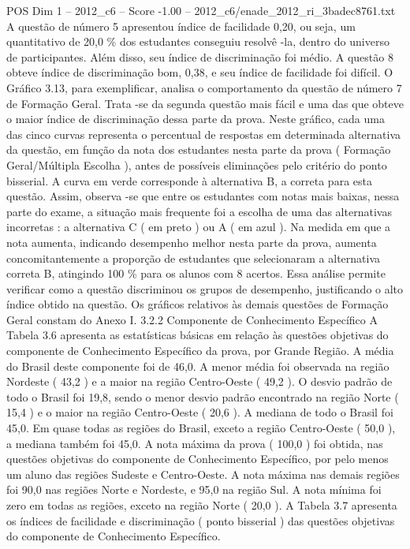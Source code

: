 \begin{textsample}{POS Dim 1 – 2012\_c6 – Score -1.00 – 2012\_c6/enade\_2012\_ri\_3badec8761.txt}
A questão de número 5 apresentou índice de facilidade 0,20, ou seja, um quantitativo de 20,0 \% dos estudantes conseguiu resolvê -la, dentro do universo de participantes.
Além disso, seu índice de discriminação foi médio.
A questão 8 obteve índice de discriminação bom, 0,38, e seu índice de facilidade foi difícil.
O Gráfico 3.13, para exemplificar, analisa o comportamento da questão de número 7 de Formação Geral.
Trata -se da segunda questão mais fácil e uma das que obteve o maior índice de discriminação dessa parte da prova.
Neste gráfico, cada uma das cinco curvas representa o percentual de respostas em determinada alternativa da questão, em função da nota dos estudantes nesta parte da prova ( Formação Geral/Múltipla Escolha ), antes de possíveis eliminações pelo critério do ponto bisserial.
A curva em verde corresponde à alternativa B, a correta para esta questão.
Assim, observa -se que entre os estudantes com notas mais baixas, nessa parte do exame, a situação mais frequente foi a escolha de uma das alternativas incorretas : a alternativa C ( em preto ) ou A ( em azul ).
Na medida em que a nota aumenta, indicando desempenho melhor nesta parte da prova, aumenta concomitantemente a proporção de estudantes que selecionaram a alternativa correta B, atingindo 100 \% para os alunos com 8 acertos.
Essa análise permite verificar como a questão discriminou os grupos de desempenho, justificando o alto índice obtido na questão.
Os gráficos relativos às demais questões de Formação Geral constam do Anexo I. 3.2.2 Componente de Conhecimento Específico A Tabela 3.6 apresenta as estatísticas básicas em relação às questões objetivas do componente de Conhecimento Específico da prova, por Grande Região.
A média do Brasil deste componente foi de 46,0.
A menor média foi observada na região Nordeste ( 43,2 ) e a maior na região Centro-Oeste ( 49,2 ).
O desvio padrão de todo o Brasil foi 19,8, sendo o menor desvio padrão encontrado na região Norte ( 15,4 ) e o maior na região Centro-Oeste ( 20,6 ).
A mediana de todo o Brasil foi 45,0.
Em quase todas as regiões do Brasil, exceto a região Centro-Oeste ( 50,0 ), a mediana também foi 45,0.
A nota máxima da prova ( 100,0 ) foi obtida, nas questões objetivas do componente de Conhecimento Específico, por pelo menos um aluno das regiões Sudeste e Centro-Oeste.
A nota máxima nas demais regiões foi 90,0 nas regiões Norte e Nordeste, e 95,0 na região Sul.
A nota mínima foi zero em todas as regiões, exceto na região Norte ( 20,0 ).
A Tabela 3.7 apresenta os índices de facilidade e discriminação ( ponto bisserial ) das questões objetivas do componente de Conhecimento Específico.

\end{textsample}
